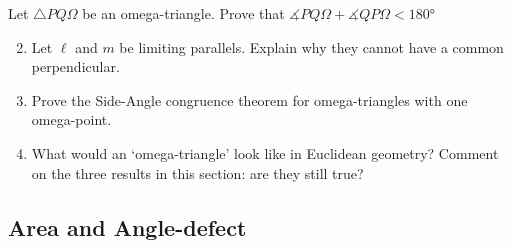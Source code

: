 % 



\begin{exercises}
	\exstart Let $\triangle PQ\Omega$ be an omega-triangle. Prove that $\measuredangle PQ\Omega+\measuredangle QP\Omega< \ang{180}$
	\begin{enumerate}\setcounter{enumi}{1}
	  \item Let $\ell$ and $m$ be limiting parallels. Explain why they cannot have a common perpendicular.
	  
	  \item Prove the Side-Angle congruence theorem for omega-triangles with one omega-point.
	  
	  \item What would an `omega-triangle' look like in Euclidean geometry? Comment on the three results in this section: are they still true?
	\end{enumerate}
\end{exercises}

\clearpage

	

\subsection{Area and Angle-defect}\label{sec:hyparea}

